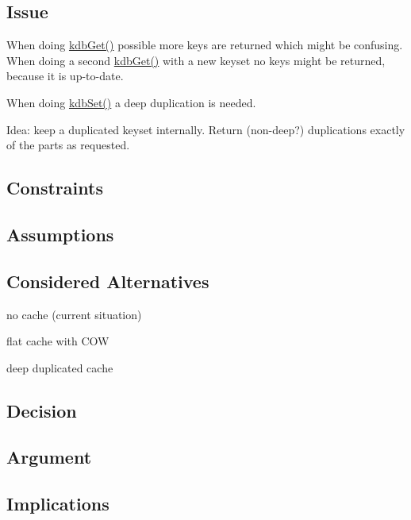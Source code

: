 \subsection*{Issue}

When doing \hyperlink{group__kdb_ga28e385fd9cb7ccfe0b2f1ed2f62453a1}{kdb\+Get()} possible more keys are returned which might be confusing. When doing a second \hyperlink{group__kdb_ga28e385fd9cb7ccfe0b2f1ed2f62453a1}{kdb\+Get()} with a new keyset no keys might be returned, because it is up-\/to-\/date.

When doing \hyperlink{group__kdb_ga11436b058408f83d303ca5e996832bcf}{kdb\+Set()} a deep duplication is needed.

Idea\+: keep a duplicated keyset internally. Return (non-\/deep?) duplications exactly of the parts as requested.

\subsection*{Constraints}

\subsection*{Assumptions}

\subsection*{Considered Alternatives}


\begin{DoxyItemize}
\item no cache (current situation)
\item flat cache with C\+O\+W
\item deep duplicated cache
\end{DoxyItemize}

\subsection*{Decision}

\subsection*{Argument}

\subsection*{Implications}

